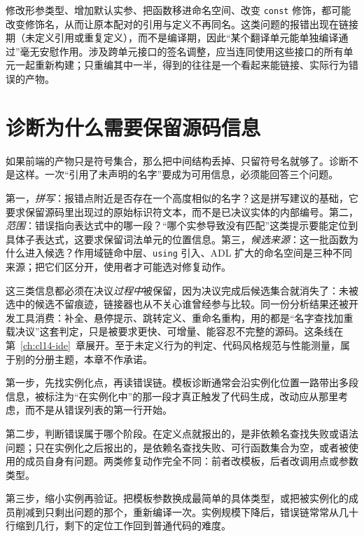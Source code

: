 \documentclass[12pt,a4paper,fontset=fandol]{ctexbook}
\newcommand{\Tp}[1]{\texttt{#1}}
\begin{document}
\begin{warning}[title={本地改动可能悄悄改变跨单元身份}]
修改形参类型、增加默认实参、把函数移进命名空间、改变 \Tp{const} 修饰，都可能改变修饰名，从而让原本配对的引用与定义不再同名。这类问题的报错出现在链接期（未定义引用或重复定义），而不是编译期，因此“某个翻译单元能单独编译通过”毫无安慰作用。涉及跨单元接口的签名调整，应当连同使用这些接口的所有单元一起重新构建；只重编其中一半，得到的往往是一个看起来能链接、实际行为错误的产物。
\end{warning}

\section{诊断为什么需要保留源码信息}\label{sec:cl03-diagnostic}

如果前端的产物只是符号集合，那么把中间结构丢掉、只留符号名就够了。诊断不是这样。一次“引用了未声明的名字”要成为可用信息，必须能回答三个问题。

第一，\emph{拼写}：报错点附近是否存在一个高度相似的名字？这是拼写建议的基础，它要求保留源码里出现过的原始标识符文本，而不是已决议实体的内部编号。第二，\emph{范围}：错误指向表达式中的哪一段？“哪个实参导致没有匹配”这类提示要能定位到具体子表达式，这要求保留词法单元的位置信息。第三，\emph{候选来源}：这一批函数为什么进入候选？作用域链命中层、\Tp{using} 引入、ADL 扩大的命名空间是三种不同来源；把它们区分开，使用者才可能选对修复动作。

这三类信息都必须在决议\emph{过程中}被保留，因为决议完成后候选集合就消失了：未被选中的候选不留痕迹，链接器也从不关心谁曾经参与比较。同一份分析结果还被开发工具消费：补全、悬停提示、跳转定义、重命名重构，用的都是“名字查找加重载决议”这套判定，只是被要求更快、可增量、能容忍不完整的源码。这条线在第~\ref{ch:cl14-ide}~章展开。至于未定义行为的判定、代码风格规范与性能测量，属于别的分册主题，本章不作承诺。

\begin{bestpractice}[title={模板报错的定位三步}]
第一步，先找实例化点，再读错误链。模板诊断通常会沿实例化位置一路带出多段信息，被标注为“在实例化中”的那一段才真正触发了代码生成，改动应从那里考虑，而不是从错误列表的第一行开始。

第二步，判断错误属于哪个阶段。在定义点就报出的，是非依赖名查找失败或语法问题；只在实例化之后报出的，是依赖名查找失败、可行函数集合为空，或者被使用的成员自身有问题。两类修复动作完全不同：前者改模板，后者改调用点或参数类型。

第三步，缩小实例再验证。把模板参数换成最简单的具体类型，或把被实例化的成员削减到只剩出问题的那个，重新编译一次。实例规模下降后，错误链常常从几十行缩到几行，剩下的定位工作回到普通代码的难度。
\end{bestpractice}
\end{document}
